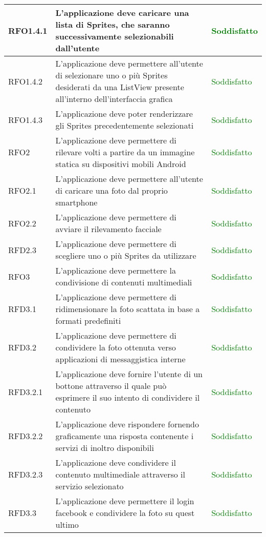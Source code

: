 \begin{center}
\begin{longtable}{ | p{2cm} | p{7cm} | p{2cm} |}
    RFO1.4.1 &  L'applicazione deve caricare una lista di Sprites, che saranno successivamente selezionabili dall'utente & \textcolor{green}{Soddisfatto}  \\ \hline
    RFO1.4.2 &  L'applicazione deve permettere all'utente di selezionare uno o più Sprites desiderati da una ListView presente all'interno dell'interfaccia grafica  & \textcolor{green}{Soddisfatto}  \\ \hline
    RFO1.4.3 &  L'applicazione deve poter renderizzare gli Sprites precedentemente selezionati & \textcolor{green}{Soddisfatto} \\ \hline    
    RFO2 &  L'applicazione deve permettere di rilevare volti a partire da un immagine statica su dispositivi mobili Android & \textcolor{green}{Soddisfatto}  \\ \hline
    RFO2.1 &  L'applicazione deve permettere all'utente di caricare una foto dal proprio smartphone & \textcolor{green}{Soddisfatto}  \\ \hline
    RFO2.2 &  L'applicazione deve permettere di avviare il rilevamento facciale & \textcolor{green}{Soddisfatto} \\ \hline
    RFD2.3 &   L'applicazione deve permettere di scegliere uno o più Sprites da utilizzare  & \textcolor{green}{Soddisfatto}  \\ \hline 
    RFO3 &  L'applicazione deve permettere la condivisione di contenuti multimediali & \textcolor{green}{Soddisfatto} \\ \hline
    RFD3.1 &  L'applicazione deve permettere di ridimensionare la foto scattata in base a formati predefiniti & \textcolor{green}{Soddisfatto} \\ \hline
    RFD3.2 &  L'applicazione deve permettere di condividere la foto ottenuta verso applicazioni di messaggistica interne  & \textcolor{green}{Soddisfatto} \\ \hline
    RFD3.2.1 &  L'applicazione deve fornire l'utente di un bottone attraverso il quale può esprimere il suo intento di condividere il contenuto  & \textcolor{green}{Soddisfatto} \\ \hline
    RFD3.2.2 &  L'applicazione deve rispondere fornendo graficamente una risposta contenente i servizi di inoltro disponibili  & \textcolor{green}{Soddisfatto} \\ \hline
    RFD3.2.3 &  L'applicazione deve condividere il contenuto multimediale attraverso il servizio selezionato  & \textcolor{green}{Soddisfatto} \\ \hline    
    RFD3.3 &  L'applicazione deve permettere il login facebook e condividere la foto su quest ultimo  & \textcolor{green}{Soddisfatto} \\ \hline

\end{longtable}
\end{center}
